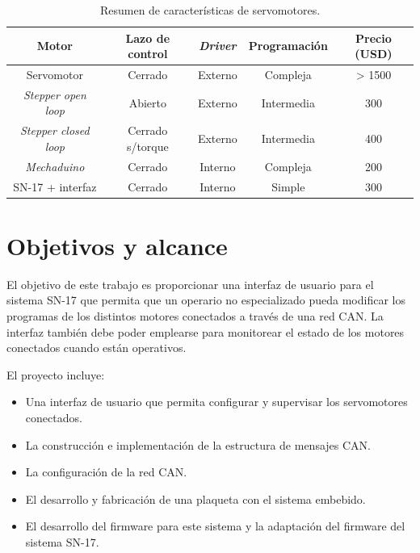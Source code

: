 \begin{table}[h!]
	\centering
	\caption[Estado del arte]{Resumen de características de servomotores.}
	\begin{tabular}{c c c c c}    
		\toprule
		\textbf{Motor} 	 & \textbf{Lazo de control}  & \textbf{\textit{Driver}} & \textbf{Programación} & \textbf{Precio (USD)} \\
		\midrule
		Servomotor & Cerrado & Externo & Compleja 	& >  1500 \\		
		\textit{Stepper open loop} & Abierto & Externo & Intermedia 	&  300\\
		\textit{Stepper closed loop} & Cerrado s/torque	& Externo & Intermedia 	&  400\\
		\textit{Mechaduino} & Cerrado	& Interno & Compleja 	&  200 \\
		SN-17 + interfaz	& Cerrado	& Interno & Simple 		&  300 \\
		\bottomrule
		\hline
	\end{tabular}
	\label{tab:servos}
\end{table}

\section{Objetivos y alcance}

El objetivo de este trabajo es proporcionar una interfaz de usuario para el sistema SN-17 que permita que un operario no especializado pueda modificar los programas de los distintos motores conectados a través de una red CAN. La interfaz también debe poder emplearse para monitorear el estado de los motores conectados cuando están operativos. 

El proyecto incluye:

\begin{itemize}
	\item Una interfaz de usuario que permita configurar y supervisar los servomotores conectados.
	\item La construcción e implementación de la estructura de mensajes CAN.
	\item La configuración de la red CAN.
	\item El desarrollo y fabricación de una plaqueta con el sistema embebido.
	\item El desarrollo del firmware para este sistema y la adaptación del firmware del sistema SN-17.
\end{itemize}


